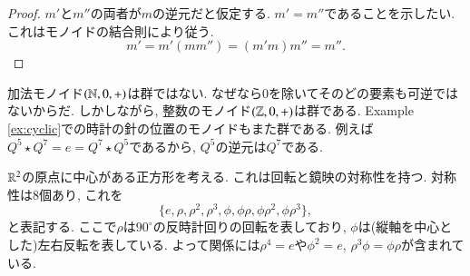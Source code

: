 \begin{proof}


$m'$と$m''$の両者が$m$の逆元だと仮定する. $m'=m''$であることを示したい. これはモノイドの結合則により従う.
$$m'=m'(mm'')=(m'm)m''=m''.$$

\end{proof}

\begin{example}


加法モノイド$({\mathbb N},0,+)$は群ではない. なぜなら$0$を除いてそのどの要素も可逆ではないからだ. しかしながら, 整数のモノイド$({\mathbb Z},0,+)$は群である. Example \ref{ex:cyclic}での時計の針の位置のモノイドもまた群である. 例えば$Q^5\star Q^7=e=Q^7\star Q^5$であるから, $Q^5$の逆元は$Q^7$である.

\end{example}

\begin{example}


${\mathbb R}^2$の原点に中心がある正方形を考える. これは回転と鏡映の対称性を持つ. 対称性は8個あり, これを$$\{e,\rho,\rho^2,\rho^3,\phi,\phi\rho,\phi\rho^2,\phi\rho^3\},$$と表記する. ここで$\rho$は$90^\circ$の反時計回りの回転を表しており, $\phi$は(縦軸を中心とした)左右反転を表している. よって関係には$\rho^4=e$や$\phi^2=e$, $\rho^3\phi=\phi\rho$が含まれている.

\end{example}

